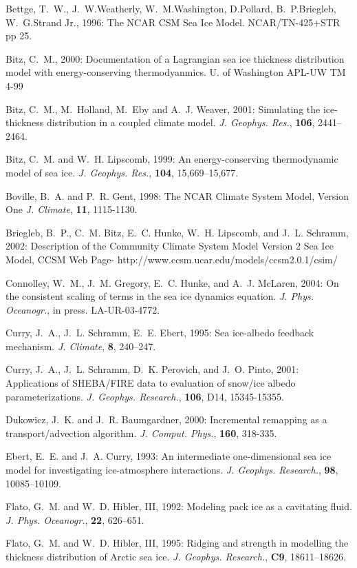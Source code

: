 Bettge, T.~W., J.~W.Weatherly, W.~M.Washington, D.Pollard, B.~P.Briegleb,
W.~G.Strand Jr., 1996: The NCAR CSM Sea Ice Model. NCAR/TN-425+STR pp 25.

Bitz, C.~M., 2000: Documentation of a Lagrangian sea ice thickness distribution
  model with energy-conserving thermodyanmics. U. of Washington  APL-UW TM 4-99 

Bitz, C.~M., M.~Holland, M.~Eby and A.~J. Weaver, 2001: Simulating the
  ice-thickness distribution in a coupled climate model. 
  {\it J. Geophys. Res.}, {\bf 106}, 2441--2464.

Bitz, C.~M. and W.~H. Lipscomb, 1999: An energy-conserving thermodynamic model
  of sea ice. {\it J. Geophys. Res.}, {\bf 104}, 15,669--15,677.

Boville, B.~A. and P.~R. Gent, 1998: The NCAR Climate System Model, Version One 
  {\it J. Climate}, {\bf 11}, 1115-1130.

Briegleb, B.~P., C.~M. Bitz, E.~C. Hunke, W.~H. Lipscomb, and J.~L. Schramm, 2002:
  Description of the Community Climate System Model Version 2 Sea Ice Model,
  CCSM Web Page- http://www.ccsm.ucar.edu/models/ccsm2.0.1/csim/

Connolley, W.~M., J.~M. Gregory, E.~C. Hunke, and A.~J. McLaren, 2004: On the
  consistent scaling of terms in the sea ice dynamics equation. {\it J. Phys. Oceanogr.}, 
  in press. LA-UR-03-4772.

Curry, J.~A., J.~L. Schramm, E.~E. Ebert, 1995: Sea ice-albedo feedback mechanism.
  {\it J. Climate}, {\bf 8}, 240--247.

Curry, J.~A., J.~L. Schramm, D.~K. Perovich, and J.~O. Pinto, 2001: Applications of
SHEBA/FIRE data to evaluation of snow/ice albedo parameterizations.
  {\it J. Geophys. Research.}, {\bf 106}, D14, 15345-15355.

Dukowicz, J.~K. and J.~R. Baumgardner, 2000: Incremental remapping as a 
transport/advection algorithm.
  {\it J. Comput. Phys.}, {\bf 160}, 318-335.

Ebert, E.~E. and J.~A. Curry, 1993: An intermediate one-dimensional sea ice
model for investigating ice-atmosphere interactions.
  {\it J. Geophys. Research.}, {\bf 98}, 10085--10109.

Flato, G.~M. and W.~D. Hibler, III, 1992: Modeling pack ice as a cavitating fluid.
  {\it J. Phys. Oceanogr.}, {\bf 22}, 626--651.

Flato, G.~M. and W.~D. Hibler, III, 1995: Ridging and strength in modelling the
  thickness distribution of Arctic sea ice.
  {\it J. Geophys. Research.}, {\bf C9}, 18611--18626.

